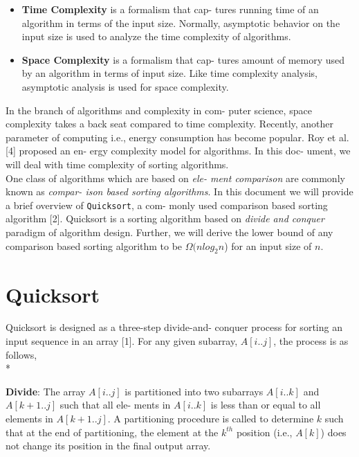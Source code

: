\documentclass[a4paper, 10pt,twocolumn]{article}
\begin{document}
\begin{itemize}
    \item \textbf{Time Complexity}  is a formalism that cap-
        tures running time of an algorithm in terms of
        the input size. Normally, asymptotic behavior
on the input size is used to analyze the time
complexity of algorithms.

\item \textbf{Space Complexity}  is a formalism that cap-
tures amount of memory used by an algorithm
in terms of input size. Like time complexity
analysis, asymptotic analysis is used for space
complexity.

\end{itemize}

In the branch of algorithms and complexity in com-
puter science, space complexity takes a back seat
compared to time complexity. Recently, another
parameter of computing i.e., energy consumption
has become popular. Roy et al. [4] proposed an en-
ergy complexity model for algorithms. In this doc-
ument, we will deal with time complexity of sorting
algorithms. \\

One class of algorithms which are based on \textit{ele-
ment comparison} are commonly known as \textit{compar-
ison based sorting algorithms}. In this document we
will provide a brief overview of \texttt{Quicksort}, a com-
monly used comparison based sorting algorithm [2]. Quicksort is a sorting algorithm based on \textit{divide and conquer} paradigm of algorithm design. Further, we will  derive the lower bound of any comparison based sorting algorithm to be $\Omega(nlog_{2}n$) for an input size of $n$.\\

\section{Quicksort}

Quicksort is designed as a three-step divide-and-
conquer process for sorting an input sequence in
an array [1]. For any given subarray, $A[i..j]$, the
process is as follows,\\*

\textbf{Divide}: The array $A[i..j]$ is partitioned into two
subarrays $A[i..k]$ and $A[k + 1..j]$ such that all ele-
ments in $A[i..k]$ is less than or equal to all elements
in $A[k + 1..j]$. A partitioning procedure is called to
determine $k$ such that at the end of partitioning,
the element at the $k^{th}$ position (i.e., $A[k]$) does not
change its position in the final output array.
\end{document}
